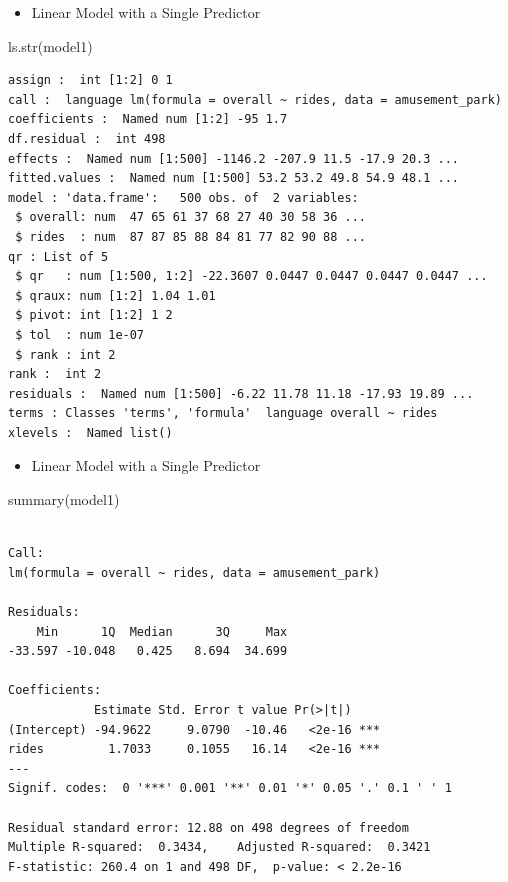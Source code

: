 \documentclass[
  ignorenonframetext,
]{beamer}
\newenvironment{Shaded}{\begin{snugshade}}{\end{snugshade}}
\newcommand{\FunctionTok}[1]{\textcolor[rgb]{0.28,0.35,0.67}{#1}}
\newcommand{\NormalTok}[1]{\textcolor[rgb]{0.00,0.23,0.31}{#1}}
\providecommand{\tightlist}{%
  \setlength{\itemsep}{0pt}\setlength{\parskip}{0pt}}\usepackage{longtable,booktabs,array}
\begin{document}
\begin{frame}[fragile]{}
\label{section-12}
\begin{itemize}
\tightlist
\item
  Linear Model with a Single Predictor
\end{itemize}

\tiny

\begin{Shaded}
\begin{Highlighting}[]
\FunctionTok{ls.str}\NormalTok{(model1)}
\end{Highlighting}
\end{Shaded}

\begin{verbatim}
assign :  int [1:2] 0 1
call :  language lm(formula = overall ~ rides, data = amusement_park)
coefficients :  Named num [1:2] -95 1.7
df.residual :  int 498
effects :  Named num [1:500] -1146.2 -207.9 11.5 -17.9 20.3 ...
fitted.values :  Named num [1:500] 53.2 53.2 49.8 54.9 48.1 ...
model : 'data.frame':   500 obs. of  2 variables:
 $ overall: num  47 65 61 37 68 27 40 30 58 36 ...
 $ rides  : num  87 87 85 88 84 81 77 82 90 88 ...
qr : List of 5
 $ qr   : num [1:500, 1:2] -22.3607 0.0447 0.0447 0.0447 0.0447 ...
 $ qraux: num [1:2] 1.04 1.01
 $ pivot: int [1:2] 1 2
 $ tol  : num 1e-07
 $ rank : int 2
rank :  int 2
residuals :  Named num [1:500] -6.22 11.78 11.18 -17.93 19.89 ...
terms : Classes 'terms', 'formula'  language overall ~ rides
xlevels :  Named list()
\end{verbatim}
\end{frame}

\begin{frame}[fragile]{}
\label{section-13}
\begin{itemize}
\tightlist
\item
  Linear Model with a Single Predictor
\end{itemize}

\tiny

\begin{Shaded}
\begin{Highlighting}[]
\FunctionTok{summary}\NormalTok{(model1)}
\end{Highlighting}
\end{Shaded}

\begin{verbatim}

Call:
lm(formula = overall ~ rides, data = amusement_park)

Residuals:
    Min      1Q  Median      3Q     Max 
-33.597 -10.048   0.425   8.694  34.699 

Coefficients:
            Estimate Std. Error t value Pr(>|t|)    
(Intercept) -94.9622     9.0790  -10.46   <2e-16 ***
rides         1.7033     0.1055   16.14   <2e-16 ***
---
Signif. codes:  0 '***' 0.001 '**' 0.01 '*' 0.05 '.' 0.1 ' ' 1

Residual standard error: 12.88 on 498 degrees of freedom
Multiple R-squared:  0.3434,    Adjusted R-squared:  0.3421 
F-statistic: 260.4 on 1 and 498 DF,  p-value: < 2.2e-16
\end{verbatim}
\end{frame}
\end{document}
